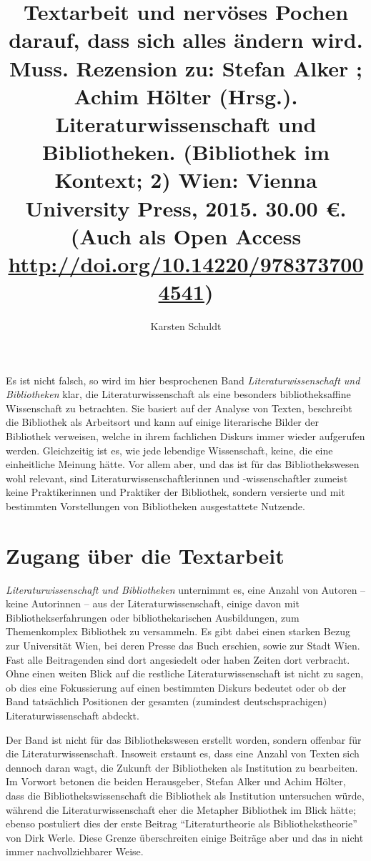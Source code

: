 \documentclass[a4paper,
fontsize=11pt,
oneside,
numbers=noperiodatend,
parskip=half-,
bibliography=totoc,
final
]{scrartcl}
\title{\LARGE{Textarbeit und nervöses Pochen darauf, dass sich alles ändern wird.
Muss. Rezension zu: Stefan Alker ; Achim Hölter (Hrsg.). Literaturwissenschaft
und Bibliotheken. (Bibliothek im Kontext; 2) Wien: Vienna University Press, 2015. 30.00 €. (Auch als Open Access \url{http://doi.org/10.14220/9783737004541})}} %
\author{Karsten Schuldt} %
\date{}
\begin{document}
\maketitle
\thispagestyle{fancyplain} 


Es ist nicht falsch, so wird im hier besprochenen Band
\emph{Literaturwissenschaft und Bibliotheken} klar, die
Literaturwissenschaft als eine besonders bibliotheksaffine Wissenschaft
zu betrachten. Sie basiert auf der Analyse von Texten, beschreibt die
Bibliothek als Arbeitsort und kann auf einige literarische Bilder der
Bibliothek verweisen, welche in ihrem fachlichen Diskurs immer wieder
aufgerufen werden. Gleichzeitig ist es, wie jede lebendige Wissenschaft,
keine, die eine einheitliche Meinung hätte. Vor allem aber, und das ist
für das Bibliothekswesen wohl relevant, sind
Literaturwissenschaftlerinnen und -wissenschaftler zumeist keine
Praktikerinnen und Praktiker der Bibliothek, sondern versierte und mit
bestimmten Vorstellungen von Bibliotheken ausgestattete Nutzende.

\section*{Zugang über die
Textarbeit}\label{zugang-uxfcber-die-textarbeit}

\emph{Literaturwissenschaft und Bibliotheken} unternimmt es, eine Anzahl
von Autoren -- keine Autorinnen -- aus der Literaturwissenschaft, einige
davon mit Bibliothekserfahrungen oder bibliothekarischen Ausbildungen,
zum Themenkomplex Bibliothek zu versammeln. Es gibt dabei einen starken
Bezug zur Universität Wien, bei deren Presse das Buch erschien, sowie
zur Stadt Wien. Fast alle Beitragenden sind dort angesiedelt oder haben
Zeiten dort verbracht. Ohne einen weiten Blick auf die restliche
Literaturwissenschaft ist nicht zu sagen, ob dies eine Fokussierung auf
einen bestimmten Diskurs bedeutet oder ob der Band tatsächlich
Positionen der gesamten (zumindest deutschsprachigen)
Literaturwissenschaft abdeckt.

Der Band ist nicht für das Bibliothekswesen erstellt worden, sondern
offenbar für die Literaturwissenschaft. Insoweit erstaunt es, dass eine
Anzahl von Texten sich dennoch daran wagt, die Zukunft der Bibliotheken
als Institution zu bearbeiten. Im Vorwort betonen die beiden
Herausgeber, Stefan Alker und Achim Hölter, dass die
Bibliothekswissenschaft die Bibliothek als Institution untersuchen
würde, während die Literaturwissenschaft eher die Metapher Bibliothek im
Blick hätte; ebenso postuliert dies der erste Beitrag
\enquote{Literaturtheorie als Bibliothekstheorie} von Dirk Werle. Diese
Grenze überschreiten einige Beiträge aber und das in nicht immer
nachvollziehbarer Weise.
\end{document}

